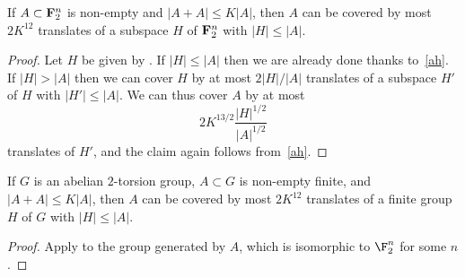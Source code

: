\begin{theorem}[PFR]\label{pfr}
\leanok
If $A \subset {\bf F}_2^n$ is non-empty and $|A+A| \leq K|A|$, then $A$ can be covered by most $2K^{12}$ translates of a subspace $H$ of ${\bf F}_2^n$ with $|H| \leq |A|$.
\end{theorem}

\begin{proof}\leanok
  Let $H$ be given by .
  If $|H| \leq |A|$ then we are already done thanks to~\eqref{ah}.  If $|H| > |A|$ then we can cover $H$ by at most $2 |H|/|A|$ translates of a subspace $H'$ of $H$ with $|H'| \leq |A|$.  We can thus cover $A$ by at most
  \[2K^{13/2} \frac{|H|^{1/2}}{|A|^{1/2}}\]
  translates of $H'$, and the claim again follows from~\eqref{ah}.
\end{proof}

\begin{corollary}\label{pfr-cor}
  \leanok
  If $G$ is an abelian $2$-torsion group, $A \subset G$ is non-empty finite, and $|A+A| \leq K|A|
  $, then $A$ can be covered by most $2K^{12}$ translates of a finite group  $H$ of $G$ with $|H| \leq |A|$.
  \end{corollary}

\begin{proof}\leanok  Apply  to the group generated by $A$, which is isomorphic to $\F_2^n$ for some $n$.
\end{proof}
